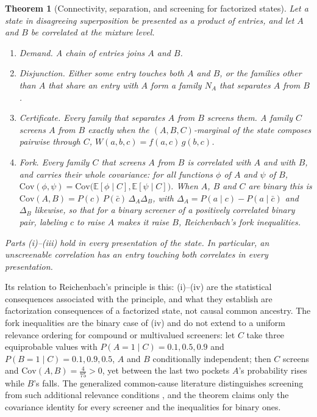 \documentclass[11pt]{article}
\newtheorem{theorem}{Theorem}
\begin{document}
\begin{theorem}[Connectivity, separation, and screening for factorized states]
\label{thm:reichenbach}
Let a state in disagreeing superposition be presented as a product of entries, and let $A$ and $B$ be correlated at the mixture level.
\begin{enumerate}
\item[(i)] \emph{Demand.} A chain of entries joins $A$ and $B$.
\item[(ii)] \emph{Disjunction.} Either some entry touches both $A$ and $B$, or the families other than $A$ that share an entry with $A$ form a family $N_A$ that separates $A$ from $B$.
\item[(iii)] \emph{Certificate.} Every family that separates $A$ from $B$ screens them. A family $C$ screens $A$ from $B$ exactly when the $(A, B, C)$-marginal of the state composes pairwise through $C$, $W(a,b,c) = f(a,c)\, g(b,c)$.
\item[(iv)] \emph{Fork.} Every family $C$ that screens $A$ from $B$ is correlated with $A$ and with $B$, and carries their whole covariance: for all functions $\phi$ of $A$ and $\psi$ of $B$, $\mathrm{Cov}(\phi, \psi) = \mathrm{Cov}\big(\mathbb{E}[\phi \mid C], \mathbb{E}[\psi \mid C]\big)$. When $A$, $B$ and $C$ are binary this is $\mathrm{Cov}(A, B) = P(c)\,P(\bar{c})\,\Delta_A \Delta_B$, with $\Delta_A = P(a \mid c) - P(a \mid \bar{c})$ and $\Delta_B$ likewise, so that for a binary screener of a positively correlated binary pair, labeling $c$ to raise $A$ makes it raise $B$, Reichenbach's fork inequalities.
\end{enumerate}
Parts (i)--(iii) hold in every presentation of the state. In particular, an unscreenable correlation has an entry touching both correlates in every presentation.
\end{theorem}

\noindent Its relation to Reichenbach's principle is this: (i)--(iv) are the statistical consequences associated with the principle, and what they establish are factorization consequences of a factorized state, not causal common ancestry. The fork inequalities are the binary case of (iv) and do not extend to a uniform relevance ordering for compound or multivalued screeners: let $C$ take three equiprobable values with $P(A = 1 \mid C) = 0.1, 0.5, 0.9$ and $P(B = 1 \mid C) = 0.1, 0.9, 0.5$, $A$ and $B$ conditionally independent; then $C$ screens and $\mathrm{Cov}(A, B) = \tfrac{4}{75} > 0$, yet between the last two pockets $A$'s probability rises while $B$'s falls. The generalized common-cause literature distinguishes screening from such additional relevance conditions \cite{hoferszabo2013principle}, and the theorem claims only the covariance identity for every screener and the inequalities for binary ones.
\end{document}
